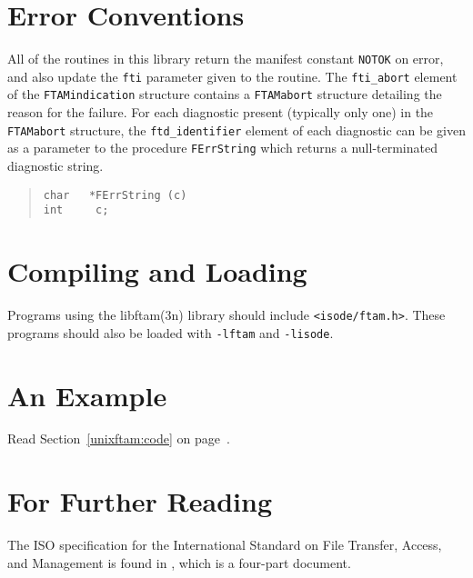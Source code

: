 \section	{Error Conventions}
All of the routines in this library return the manifest constant \verb"NOTOK"
on error,
and also update the \verb"fti" parameter given to the routine.
The \verb"fti_abort" element of the \verb"FTAMindication" structure contains a
\verb"FTAMabort" structure detailing the reason for the failure.
For each diagnostic present (typically only one) in the \verb"FTAMabort"
structure,
the \verb"ftd_identifier" element of each diagnostic can be given as a
parameter to the procedure \verb"FErrString" which returns a null-terminated
diagnostic string.
\begin{quote}\small\begin{verbatim}
char   *FErrString (c)
int     c;
\end{verbatim}\end{quote}

\section	{Compiling and Loading}
Programs using the \man libftam(3n) library should include
\verb"<isode/ftam.h>".
These programs should also be loaded with \verb"-lftam" and \verb"-lisode".

\section	{An Example}
Read Section~\ref{unixftam:code} on page~\pageref{unixftam:code}.

\section	{For Further Reading}
The ISO specification for the International Standard on
File Transfer, Access, and Management is found in \cite{ISO.FTAM},
which is a four-part document.


